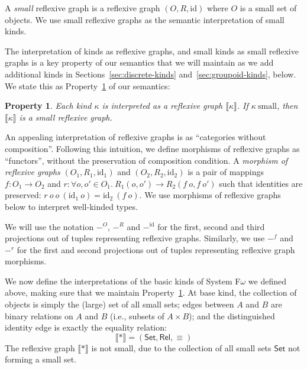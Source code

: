 \documentclass{sigplanconf}
\newtheorem{property}{Property}
\theoremstyle{examplestyle}
\newcommand{\sem}[1]{\llbracket #1 \rrbracket}
\newcommand{\Set}{\mathsf{Set}}
\newcommand{\Rel}{\mathsf{Rel}}
\begin{document}
A \emph{small} reflexive graph is a reflexive graph $(O, R,
\mathrm{id})$ where $O$ is a small set of objects. We use small
reflexive graphs as the semantic interpretation of small kinds.

The interpretation of kinds as reflexive graphs, and small kinds as
small reflexive graphs is a key property of our semantics that we will
maintain as we add additional kinds in
Sections~\ref{sec:discrete-kinds} and~\ref{sec:groupoid-kinds},
below. We state this as Property~\ref{property:semantic-kinds} of our
semantics:

\begin{property}\label{property:semantic-kinds}
  Each kind $\kappa$ is interpreted as a reflexive graph
  $\sem{\kappa}$. If $\kappa~\mathrm{small}$, then $\sem{\kappa}$ is a
  small reflexive graph.
\end{property}

An appealing interpretation of reflexive graphs is as ``categories
without composition''. Following this intuition, we define morphisms
of reflexive graphs as ``functors'', without the preservation of
composition condition. A \emph{morphism of reflexive graphs}
$(O_1,R_1,\mathrm{id}_1)$ and $(O_2, R_2, \mathrm{id}_2)$ is a pair of
mappings $f : O_1 \to O_2$ and $r : \forall o, o' \in
O_1.~R_1(o,o') \to R_2(f~o, f~o')$ such that identities are
preserved: $r~o~o~(\mathrm{id}_1~o) = \mathrm{id}_2~(f~o)$. We use
morphisms of reflexive graphs below to interpret well-kinded types.

We will use the notation $-^O$, $-^R$ and $-^{\mathrm{id}}$ for the
first, second and third projections out of tuples representing
reflexive graphs. Similarly, we use $-^f$ and $-^r$ for the first and
second projections out of tuples representing reflexive graph
morphisms.

We now define the interpretations of the basic kinds of System
F$\omega$ we defined above, making sure that we maintain
Property~\ref{property:semantic-kinds}. At base kind, the collection
of objects is simply the (large) set of all small sets; edges between
$A$ and $B$ are binary relations on $A$ and $B$ (i.e., subsets of $A
\times B$); and the distinguished identity edge is exactly the
equality relation:
\begin{displaymath}
  \sem{*} = (\Set, \Rel, \equiv)
\end{displaymath}
The reflexive graph $\sem{*}$ is not small, due to the collection of
all small sets $\Set$ not forming a small set.
\end{document}
